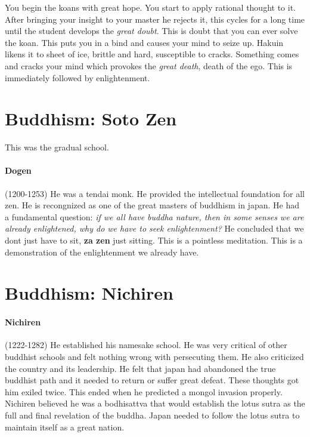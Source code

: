 \documentclass{article}
\begin{document}
You begin the koans with great hope. You start to apply rational thought to it. After bringing your insight to your master he rejects it, this cycles for a long time until the student develops the \emph{great doubt}. This is doubt that you can ever solve the koan. This puts you in a bind and causes your mind to seize up. Hakuin likens it to sheet of ice, brittle and hard, susceptible to cracks. Something comes and cracks your mind which provokes the \emph{great death}, death of the ego. This is immediately followed by enlightenment.

\section*{Buddhism: Soto Zen}
\label{sec:biddhism_soto_zen}
This was the gradual school.

\paragraph{Dogen}
\label{par:dogen}
(1200-1253) He was a tendai monk. He provided the intellectual foundation for all zen. He is recongnized as one of the great masters of buddhism in japan. He had a fundamental question: \emph{if we all have buddha nature, then in some senses we are already enlightened, why do we have to seek enlightenment?} He concluded that we dont just have to sit, \textbf{za zen} just sitting. This is a pointless meditation. This is a demonstration of the enlightenment we already have.

\section*{Buddhism: Nichiren}
\label{sec:buddhism_nichiren}
\paragraph{Nichiren}
\label{par:nichiren}
(1222-1282) He established his namesake school. He was very critical of other buddhist schools and felt nothing wrong with persecuting them. He also criticized the country and its leadership. He felt that japan had abandoned the true buddhist path and it needed to return or suffer great defeat. These thoughts got him exiled twice. This ended when he predicted a mongol invasion properly. Nichiren believed he was a bodhisattva that would establish the lotus sutra as the full and final revelation of the buddha. Japan needed to follow the lotus sutra to maintain itself as a great nation.
\end{document}
